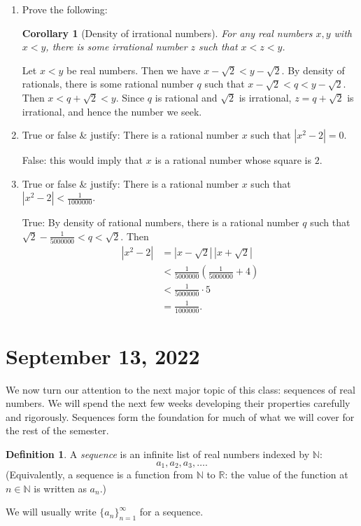 \documentclass[12pt]{amsart}
\newcommand{\R}{{\mathbb{R}}}
\newcommand{\N}{\mathbb{N}}
\numberwithin{equation}{section}
\theoremstyle{plain} %
\newtheorem{cor}[equation]{Corollary}
\newcommand{\Sept}[1]{\section{September #1, 2022}}
\theoremstyle{definition}
\newtheorem{defn}[equation]{Definition}
\theoremstyle{remark}
\begin{document}
\begin{enumerate}
\item Prove the following:
\begin{cor}[Density of irrational numbers] For any real numbers $x,y$ with $x<y$, there is some irrational number $z$ such that $x<z<y$.
\end{cor}
 
 \begin{framed}
Let $x<y$ be real numbers. Then we have $x-\sqrt{2} < y-\sqrt{2}$. By density of rationals, there is some rational number $q$ such that $x-\sqrt{2} < q < y-\sqrt{2}$. Then $x < q + \sqrt{2} < y$. Since $q$ is rational and $\sqrt{2}$ is irrational, $z=q+\sqrt{2}$ is irrational, and hence the number we seek.
\end{framed}

\item True or false \& justify: There is a rational number $x$ such that $|x^2 - 2| = 0$.

 \begin{framed}
False: this would imply that $x$ is a rational number whose square is $2$.
\end{framed}

\item True or false \& justify: There is a rational number $x$ such that $|x^2 - 2| < \frac{1}{1000000}$.

 \begin{framed}
 True: By density of rational numbers, there is a rational number $q$ such that $\sqrt{2}- \frac{1}{5000000} < q < \sqrt{2}$. Then 
\begin{align*} |x^2- 2| &= |x-\sqrt{2} | \, |x+\sqrt{2}| \\&< \frac{1}{5000000} \left( \frac{1}{5000000} + 4\right) \\&< \frac{1}{5000000} \cdot 5 \\&= \frac{1}{1000000}.\end{align*}
\end{framed}

\end{enumerate}



\Sept{13}


We now turn our attention to the next major topic of this class: sequences of real numbers. We will spend the next few weeks developing their properties carefully and
rigorously. Sequences form the foundation for much of what we will cover for the rest of the semester. 


\begin{defn} A {\em sequence} is an infinite list of real numbers indexed by $\N$:
$$
a_1, a_2, a_3, \dots.
$$
(Equivalently, a sequence is a function from $\N$ to $\R$: the value of the function at $n \in \N$ is written as $a_n$.)

We will usually write $\{a_n\}_{n=1}^\infty$ for a sequence.
\end{defn}
\end{document}
